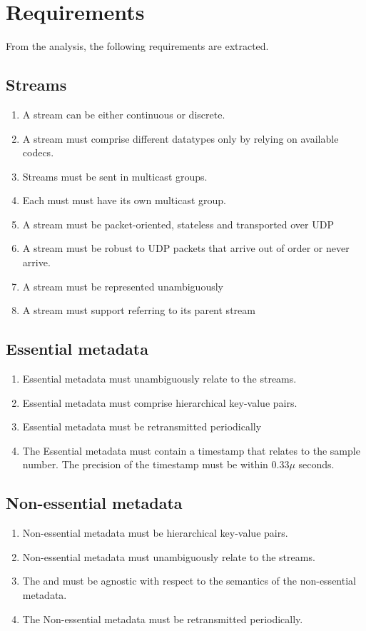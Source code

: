 \section{Requirements}
From the analysis, the following requirements are extracted.
\subsection{Streams}
\begin{enumerate}
	\item A stream can be either continuous or discrete.
	\item A stream must comprise different datatypes only by relying on available codecs.
    \item Streams must be sent in multicast groups.
    \item Each must must have its own multicast group.
	\item A stream must be packet-oriented, stateless and transported over UDP
	\item A stream must be robust to UDP packets that arrive out of order or never arrive.
	\item A stream must be represented unambiguously
	\item A stream must support referring to its parent stream
\end{enumerate}

\subsection{Essential metadata}
\begin{enumerate}
	\item Essential metadata must unambiguously relate to the streams.
	\item Essential metadata must comprise hierarchical key-value pairs.
	\item Essential metadata must be retransmitted periodically
	\item The Essential metadata must contain a timestamp that relates to the sample number. The precision of the timestamp must be within $0.33\mu$ seconds.
\end{enumerate}

\subsection{Non-essential metadata}
\begin{enumerate}
	\item Non-essential metadata must be hierarchical key-value pairs.
	\item Non-essential metadata must unambiguously relate to the streams.
	\item The  and  must be agnostic with respect to the semantics of the non-essential metadata.
	\item The Non-essential metadata must be retransmitted periodically.
\end{enumerate}

